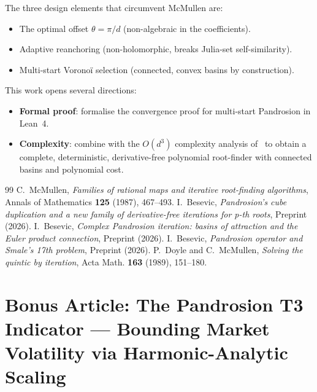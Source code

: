 \documentclass[10pt,a4paper,oneside]{book}
\theoremstyle{definition}
\theoremstyle{remark}
\begin{document}
The three design elements that circumvent McMullen are:
\begin{itemize}[nosep]
\item The optimal offset $\theta = \pi/d$ (non-algebraic in the coefficients).
\item Adaptive reanchoring (non-holomorphic, breaks Julia-set self-similarity).
\item Multi-start Vorono\"i selection (connected, convex basins by construction).
\end{itemize}

This work opens several directions:
\begin{itemize}
\item \textbf{Formal proof}: formalise the convergence proof for multi-start Pandrosion in Lean~4.
\item \textbf{Complexity}: combine with the $O(d^3)$ complexity analysis of~\cite{Besevic2026g} to obtain a complete, deterministic, derivative-free polynomial root-finder with connected basins and polynomial cost.
\end{itemize}

\begin{thebibliography}{99}
 C.~McMullen, \emph{Families of rational maps and iterative root-finding algorithms}, Annals of Mathematics \textbf{125} (1987), 467--493.
 I.~Besevic, \emph{Pandrosion's cube duplication and a new family of derivative-free iterations for p-th roots}, Preprint (2026).
 I.~Besevic, \emph{Complex Pandrosion iteration: basins of attraction and the Euler product connection}, Preprint (2026).
 I.~Besevic, \emph{Pandrosion operator and Smale's 17th problem}, Preprint (2026).
 P.~Doyle and C.~McMullen, \emph{Solving the quintic by iteration}, Acta Math. \textbf{163} (1989), 151--180.
\end{thebibliography}






\chapter{Bonus Article: The Pandrosion T3 Indicator --- Bounding Market Volatility via Harmonic-Analytic Scaling}
\end{document}
